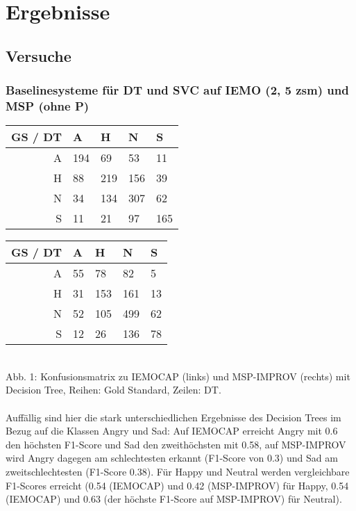 \documentclass{article} %
\begin{document}
\section{Ergebnisse}

\subsection{Versuche}

\subsubsection{Baselinesysteme für DT und SVC auf IEMO (2, 5 zsm) und MSP (ohne P)}

\begin{tabular}{|r|llll|}
\hline
GS / DT & A & H & N & S \\
\hline
A & 194 & 69 & 53 & 11 \\
H & 88 & 219 & 156 & 39 \\
N & 34 & 134 & 307 & 62 \\
S & 11 & 21 & 97 & 165 \\
\hline
\end{tabular}
\begin{tabular}{|r|llll|}
\hline
GS / DT & A & H & N & S \\
\hline
A & 55 & 78 & 82 & 5 \\
H & 31 & 153 & 161 & 13 \\
N & 52 & 105 & 499 & 62 \\
S & 12 & 26 & 136 & 78 \\
\hline
\end{tabular} \\

Abb. 1: Konfusionsmatrix zu IEMOCAP (links) und MSP-IMPROV (rechts) mit Decision Tree, Reihen: Gold Standard, Zeilen: DT. \\ \\
Auffällig sind hier die stark unterschiedlichen Ergebnisse des Decision Trees im Bezug auf die Klassen Angry und Sad: Auf IEMOCAP erreicht Angry mit 0.6 den höchsten F1-Score und Sad den zweithöchsten mit 0.58, auf MSP-IMPROV wird Angry dagegen am schlechtesten erkannt (F1-Score von 0.3) und Sad am zweitschlechtesten (F1-Score 0.38). Für Happy und Neutral werden vergleichbare F1-Scores erreicht (0.54 (IEMOCAP) und 0.42 (MSP-IMPROV) für Happy, 0.54 (IEMOCAP) und 0.63 (der höchste F1-Score auf MSP-IMPROV) für Neutral). 
\end{document}
